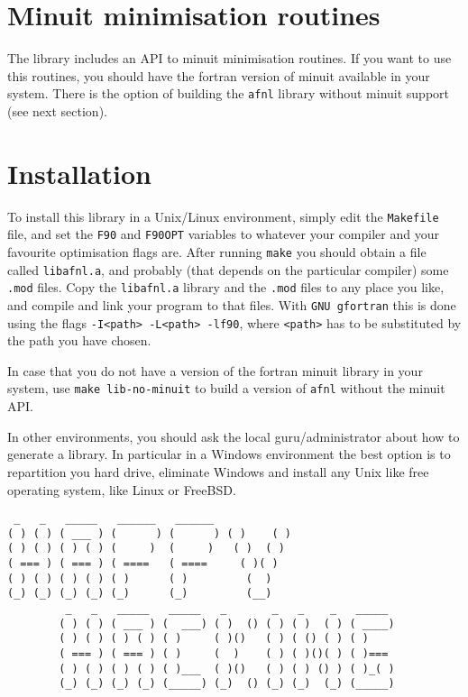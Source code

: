 \section*{Minuit minimisation routines}

The library includes an API to minuit minimisation routines. If you
want to use this routines, you should have the fortran version of
minuit available in your system. There is the option of building the
\texttt{afnl} library without minuit support (see next section).


\section*{Installation}

To install this library in a Unix/Linux environment, simply edit the
\texttt{Makefile} file, and set the \texttt{F90} and \texttt{F90OPT}
variables to whatever your compiler and your favourite optimisation
flags are. After running \texttt{make} you should obtain a file called
\texttt{libafnl.a}, and probably (that depends on the particular
compiler) some \texttt{.mod} files. Copy the \texttt{libafnl.a} library
and the \texttt{.mod} files to any place you like, and compile and
link your program to that files. With \texttt{GNU gfortran} this is
done using the flags \texttt{-I<path> -L<path> -lf90}, where
\texttt{<path>} has to be substituted by the path you have chosen.

In case that you do not have a version of the fortran minuit library
in your system, use \texttt{make lib-no-minuit} to build a version of
\texttt{afnl} without the minuit API.

In other environments, you should ask the local guru/administrator
about how to generate a library. In particular in a Windows environment
the best option is to repartition you hard drive, eliminate Windows
and install any Unix like free operating system, like Linux or
FreeBSD. 
\begin{verbatim}
 _   _   _____   ______   ______
( ) ( ) ( ___ ) (      ) (      ) ( )    ( )
( ) ( ) ( ) ( ) (     )  (     )   ( )  ( )
( === ) ( === ) ( ====   ( ====     ( )( )
( ) ( ) ( ) ( ) ( )      ( )         (  )
(_) (_) (_) (_) (_)      (_)         (__)
         _   _   _____   _____   _       _   _    _   _____
        ( ) ( ) ( ___ ) (  ___) ( )  () ( ) ( )  ( ) ( ____)
        ( ) ( ) ( ) ( ) ( )     ( )()   ( ) ( () ( ) ( )
        ( === ) ( === ) ( )     (  )    ( ) ( )()( ) ( )===
        ( ) ( ) ( ) ( ) ( )___  ( )()   ( ) ( ) () ) ( )_( )
        (_) (_) (_) (_) (_____) (_)  () (_) (_)  (_) (_____)
\end{verbatim}







 